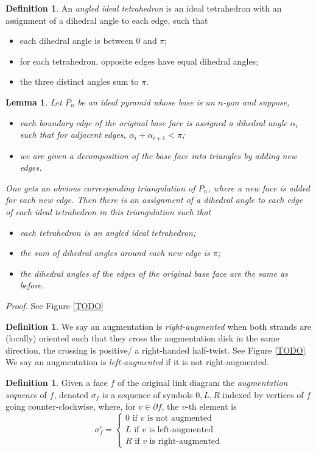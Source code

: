 \documentclass[11pt]{amsart}
\theoremstyle{plain}
\newtheorem{lemma}[theorem]{Lemma}
\theoremstyle{definition}
\newtheorem{define}[theorem]{Definition}
\begin{document}
\begin{define}
An \emph{angled ideal tetrahedron} is an ideal tetrahedron with an assignment of a dihedral angle
to each edge, such that
\begin{itemize}
\item each dihedral angle is between 0 and $\pi$;
\item for each tetrahedron, opposite edges have equal dihedral angles;
\item the three distinct angles sum to $\pi$.
\end{itemize}
\end{define}


\begin{lemma}
Let $P_n$ be an ideal pyramid whose base is an $n$-gon and suppose,
\begin{itemize}
\item each boundary edge of the original base face is assigned a dihedral angle $\alpha_i$ such that for adjacent edges, $\alpha_i + \alpha_{i+1} < \pi$;
\item we are given a decomposition of the base face into triangles by adding new edges. 
\end{itemize}
One gets an obvious corresponding triangulation of $P_n$, where a new face is added for each new edge. Then there is an assignment of a dihedral angle to each edge of each ideal tetrahedron in this triangulation such that
\begin{itemize}
\item each tetrahedron is an angled ideal tetrahedron;
\item the sum of dihedral angles around each new edge is $\pi$;
\item the dihedral angles of the edges of the original base face are the same as before.
\end{itemize} 
\end{lemma}

{\it Proof.} See Figure \ref{TODO}

\begin{define}
We say an augmentation is \emph{right-augmented} when both strands are (locally) oriented such that they cross the augmentation disk in the same direction, the crossing is positive/ a right-handed half-twist. See Figure \ref{TODO}
We say an augmentation is \emph{left-augmented} if it is not right-augmented.
\end{define}

\begin{define}
Given a face $f$ of the original link diagram the \emph{augmentation sequence} of $f$, denoted $\sigma_f$ is a sequence of symbols $0, L, R$ indexed by vertices of $f$ going counter-clockwise, where, for $v \in \partial f$, the $v$-th element is
\[
\sigma_f^v = 
\begin{cases}
0 \text{ if $v$ is not augmented} \\
L \text{ if $v$ is left-augmented} \\
R \text{ if $v$ is right-augmented}
\end{cases}
\]
\end{define}
\end{document}
